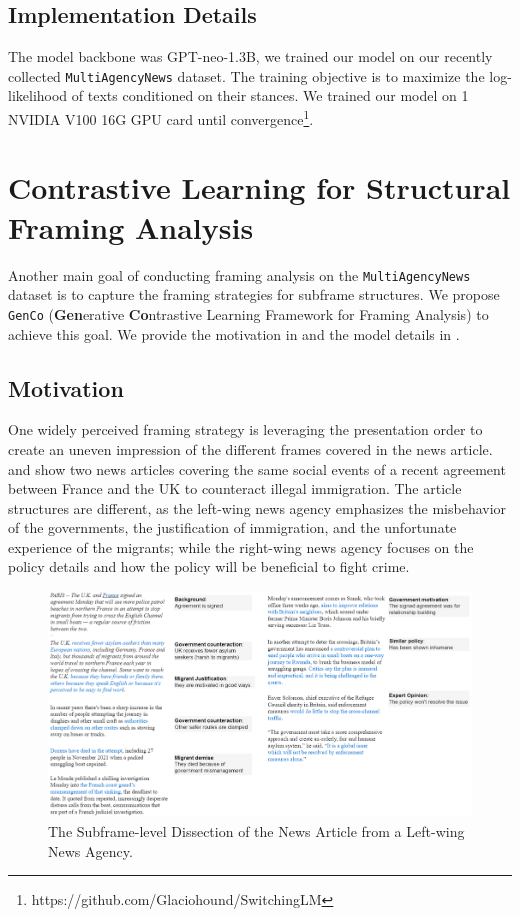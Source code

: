 \subsection{Implementation Details}
\label{switch-implement}
The model backbone was GPT-neo-1.3B, we trained our model on our recently collected \texttt{MultiAgencyNews} dataset. The training objective is to maximize the log-likelihood of texts conditioned on their stances. We trained our model on 1 NVIDIA V100 16G GPU card until convergence\footnote{https://github.com/Glaciohound/SwitchingLM}.


\section{Contrastive Learning for Structural Framing Analysis}
\label{genco}
Another main goal of conducting framing analysis on the \texttt{MultiAgencyNews} dataset is to capture the framing strategies for subframe structures. We propose \texttt{GenCo} (\textbf{Gen}erative \textbf{Co}ntrastive Learning Framework for Framing Analysis) to achieve this goal. We provide the motivation in  and the model details in .

\subsection{Motivation}
\label{genco-motivation}
One widely perceived framing strategy is leveraging the presentation order to create an uneven impression of the different frames covered in the news article.  and  show two news articles covering the same social events of a recent agreement between France and the UK to counteract illegal immigration. The article structures are different, as the left-wing news agency emphasizes the misbehavior of the governments, the justification of immigration, and the unfortunate experience of the migrants; while the right-wing news agency focuses on the policy details and how the policy will be beneficial to fight crime. 
\clearpage

\begin{figure}[ht!]
    \centering
    \includegraphics[width=\textwidth]{img/genco-motivation-left}
    \caption{The Subframe-level Dissection of the News Article from a Left-wing News Agency.}
    \label{fig:genco-motivation-left}
\end{figure}

